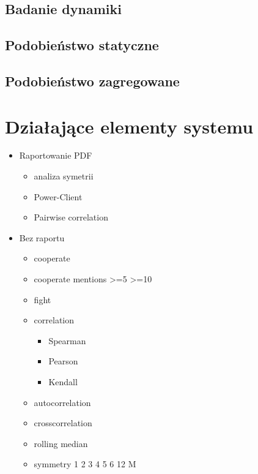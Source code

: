 \documentclass[11pt]{report}
\begin{document}
    \subsection{Badanie dynamiki}

    \subsection{Podobieństwo statyczne}

    \subsection{Podobieństwo zagregowane}


    \section{Działające elementy systemu}
    \begin{itemize}
        \item Raportowanie PDF
        \begin{itemize}
            \item analiza symetrii
            \item Power-Client
            \item Pairwise correlation
        \end{itemize}
        \item Bez raportu
        \begin{itemize}
            \item cooperate
            \item cooperate mentions >=5 >=10
            \item fight
            \item correlation
            \begin{itemize}
                \item Spearman
                \item Pearson
                \item Kendall
            \end{itemize}
            \item autocorrelation
            \item crosscorrelation
            \item rolling median
            \item symmetry 1 2 3 4 5 6 12 M
        \end{itemize}
    \end{itemize}
\end{document}
